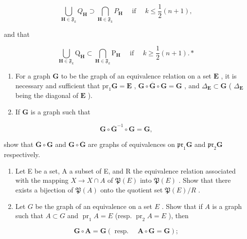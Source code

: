 \[
\bigcup_ {\mathbf {H} \in \mathfrak {F} _ {k}} Q _ {\mathbf {H}} \supset \bigcap_ {\mathbf {H} \in \mathfrak {F} _ {k}} P _ {\mathbf {H}} \quad \text { if } \quad k \leqslant \frac {1}{2} (n + 1),
\]

and that

\[
\bigcup_ {\mathbf {H} \in \mathfrak {F} _ {k}} \mathrm{Q} _ {\mathbf {H}} \subset \bigcap_ {\mathbf {H} \in \mathfrak {F} _ {k}} \mathrm{P} _ {\mathbf {H}} \quad \text { if } \quad k \geqslant \frac {1}{2} (n + 1). *
\]

\exercisegroup

\begin{enumerate}
\def\labelenumi{\arabic{enumi}.}
\item
  For a graph \(\mathbf{G}\) to be the graph of an equivalence relation on a set \(\mathbf{E}\) , it is necessary and sufficient that \(\mathrm{pr}_1\mathbf{G} = \mathbf{E}\) , \(\mathbf{G} \circ \overline{\mathbf{G}} \circ \mathbf{G} = \mathbf{G}\) , and \(\Delta_{\mathbf{E}} \subset \mathbf{G}\) ( \(\Delta_{\mathbf{E}}\) being the diagonal of \(\mathbf{E}\) ).
\item
  If \(\mathbf{G}\) is a graph such that
\end{enumerate}

\[
\mathbf {G} \circ \overline {{{{\mathbf {G}}}}} ^ {- 1} \circ \mathbf {G} = \mathbf {G},
\]

show that \(\overline{\mathbf{G}}\circ \mathbf{G}\) and \(\mathbf{G}\circ \overline{\mathbf{G}}\) are graphs of equivalences on \(\mathfrak{pr}_1\mathbf{G}\) and \(\mathfrak{pr}_2\mathbf{G}\) respectively.

\begin{enumerate}
\def\labelenumi{\arabic{enumi}.}
\setcounter{enumi}{2}
\item
  Let E be a set, A a subset of E, and R the equivalence relation associated with the mapping \(X \rightarrow X \cap A\) of \(\mathfrak{P}(E)\) into \(\mathfrak{P}(E)\) . Show that there exists a bijection of \(\mathfrak{P}(A)\) onto the quotient set \(\mathfrak{P}(E)/R\) .
\item
  Let \(G\) be the graph of an equivalence on a set \(E\) . Show that if \(A\) is a graph such that \(A \subset G\) and \(\operatorname{pr}_1 A = E\) (resp. \(\operatorname{pr}_2 A = E\) ), then
\end{enumerate}

\[
\mathbf {G} \circ \mathbf {A} = \mathbf {G} (\text { resp. } \quad \mathbf {A} \circ \mathbf {G} = \mathbf {G});
\]

